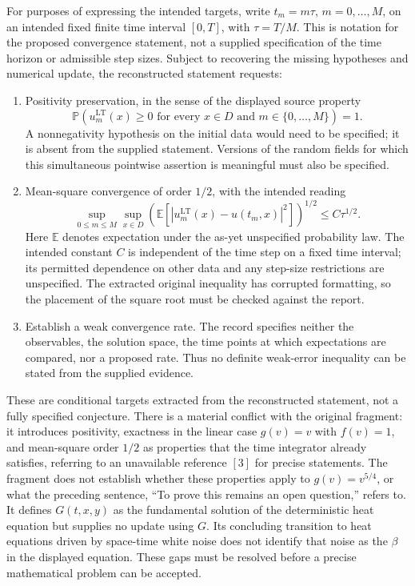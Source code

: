 \documentclass[11pt]{article}
\begin{document}
For purposes of expressing the intended targets, write \(t_m=m\tau\), \(m=0,\ldots,M\), on an intended fixed finite time interval \([0,T]\), with \(\tau=T/M\). This is notation for the proposed convergence statement, not a supplied specification of the time horizon or admissible step sizes. Subject to recovering the missing hypotheses and numerical update, the reconstructed statement requests:
\begin{enumerate}
\item Positivity preservation, in the sense of the displayed source property
\[
\mathbb{P}\!\left(u_m^{\mathrm{LT}}(x)\geq 0\text{ for every }x\in D\text{ and }m\in\{0,\ldots,M\}\right)=1.
\]
A nonnegativity hypothesis on the initial data would need to be specified; it is absent from the supplied statement. Versions of the random fields for which this simultaneous pointwise assertion is meaningful must also be specified.
\item Mean-square convergence of order \(1/2\), with the intended reading
\[
\sup_{0\leq m\leq M}\sup_{x\in D}
\left(\mathbb{E}\left[\left|u_m^{\mathrm{LT}}(x)-u(t_m,x)\right|^2\right]\right)^{1/2}
\leq C\tau^{1/2}.
\]
Here \(\mathbb{E}\) denotes expectation under the as-yet unspecified probability law. The intended constant \(C\) is independent of the time step on a fixed time interval; its permitted dependence on other data and any step-size restrictions are unspecified. The extracted original inequality has corrupted formatting, so the placement of the square root must be checked against the report.
\item Establish a weak convergence rate. The record specifies neither the observables, the solution space, the time points at which expectations are compared, nor a proposed rate. Thus no definite weak-error inequality can be stated from the supplied evidence.
\end{enumerate}

These are conditional targets extracted from the reconstructed statement, not a fully specified conjecture. There is a material conflict with the original fragment: it introduces positivity, exactness in the linear case \(g(v)=v\) with \(f(v)=1\), and mean-square order \(1/2\) as properties that the time integrator already satisfies, referring to an unavailable reference \([3]\) for precise statements. The fragment does not establish whether these properties apply to \(g(v)=v^{5/4}\), or what the preceding sentence, ``To prove this remains an open question,'' refers to. It defines \(G(t,x,y)\) as the fundamental solution of the deterministic heat equation but supplies no update using \(G\). Its concluding transition to heat equations driven by space-time white noise does not identify that noise as the \(\beta\) in the displayed equation. These gaps must be resolved before a precise mathematical problem can be accepted.
\end{document}
